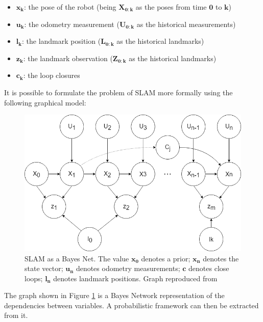 \documentclass[11pt]{article}
\begin{document}
\begin{itemize}
\item $\mathbf{x_k}$: the pose of the robot (being $\mathbf{X_{0:k}}$ as the poses from time $\mathbf{0}$ to $\mathbf{k}$)
\item $\mathbf{u_k}$: the odometry measurement ($\mathbf{U_{0:k}}$ as the historical measurements)
\item $\mathbf{l_k}$: the landmark position ($\mathbf{L_{0:k}}$ as the historical landmarks)
\item $\mathbf{z_k}$: the landmark observation ($\mathbf{Z_{0:k}}$ as the historical landmarks)
\item $\mathbf{c_k}$: the loop closures
\end{itemize}

It is possible to formulate the problem of SLAM more formally using the following graphical model:

\begin{figure}
\begin{minipage}{0.65\textwidth}
\centering
\includegraphics[width=\textwidth]{BayesNetSLAM}
\end{minipage} \hfill
\begin{minipage}{0.35\textwidth}
\centering
\caption{SLAM as a Bayes Net. The value $\mathbf{x_0}$ denotes a prior; $\mathbf{x_n}$ denotes the state vector; $\mathbf{u_n}$ denotes odometry measurements; $\mathbf{c}$ denotes close loops; $\mathbf{l_n}$ denotes landmark positions. Graph reproduced from \cite{Kaess08tro}}
\label{fig:slam1}
\end{minipage}				
\end{figure}
	
The graph shown in Figure \ref{fig:slam1} is a Bayes Network representation of the dependencies between variables. A probabilistic framework can then be extracted from it. 
\end{document}
